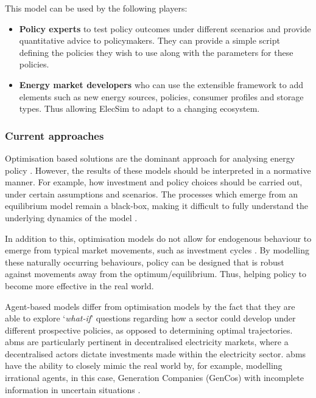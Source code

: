 This model can be used by the following players:

\begin{itemize}
	\item {\bf Policy experts} to test policy outcomes under different scenarios and provide quantitative advice to policymakers. They can provide a simple script defining the policies they wish to use along with the parameters for these policies.
	\item {\bf Energy market developers} who can use the extensible framework to add elements such as new energy sources, policies, consumer profiles and storage types. Thus allowing ElecSim to adapt to a changing ecosystem.
\end{itemize}






\subsubsection{Current approaches}

Optimisation based solutions are the dominant approach for analysing energy policy \cite{Chappin2017}. However, the results of these models should be interpreted in a normative manner. For example, how investment and policy choices should be carried out, under certain assumptions and scenarios. The processes which emerge from an equilibrium model remain a black-box, making it difficult to fully understand the underlying dynamics of the model \cite{Chappin2017}. 



In addition to this, optimisation models do not allow for endogenous behaviour to emerge from typical market movements, such as investment cycles \cite{Chappin2017, Gross2007}. By modelling these naturally occurring behaviours, policy can be designed that is robust against movements away from the optimum/equilibrium. Thus, helping policy to become more effective in the real world. 

Agent-based models differ from optimisation models by the fact that they are able to explore `\textit{what-if}' questions regarding how a sector could develop under different prospective policies, as opposed to determining optimal trajectories. \acrshort{abm}s are particularly pertinent in decentralised electricity markets, where a decentralised actors dictate investments made within the electricity sector. \acrshort{abm}s have the ability to closely mimic the real world by, for example, modelling irrational agents, in this case, Generation Companies (GenCos) with incomplete information in uncertain situations \cite{Ghorbani2014}. 


